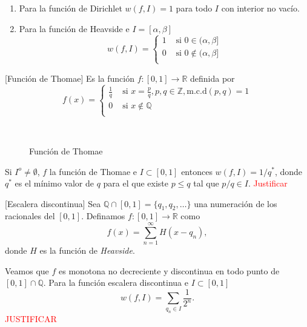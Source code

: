 \begin{ejemplo}{} 
\begin{enumerate}
 \item Para la función de Dirichlet $w(f,I)=1$ para todo $I$ con interior no vacío.
 \item Para la función de Heavside e $I=[\alpha,\beta]$
 \[
  w(f,I)=\begin{cases}
          1 & \text{ si } 0\in (\alpha,\beta]\\
          0 & \text{ si } 0\notin (\alpha,\beta]\\
         \end{cases}
 \]
\end{enumerate}
\end{ejemplo}






\begin{ejemplo}{}[Función de Thomae] Es la función $f:[0,1]\to\mathbb{R}$ definida por 
\[
 f(x)=\begin{cases} \frac{1}{q} & \text{ si } x=\frac{p}{q},p,q\in\mathbb{Z}, \text{m.c.d}(p,q)=1
 \\0 & \text{ si }   x\notin\mathbb{Q}\\
\end{cases}
\]

\begin{figure}[H]
\\
\caption{Función de Thomae}
\end{figure}


Si $I^o\neq\emptyset$, $f$ la función de Thomae e $I\subset [0,1]$ entonces 
     $ w(f,I)=1/q^*$, donde $q^*$ es el mínimo valor de $q$ para el que existe $p\leq q$ tal que $p/q\in I$. \textcolor{red}{Justificar}


\end{ejemplo}

 \begin{ejemplo}{}[Escalera discontinua] Sea $\mathbb{Q}\cap [0,1]=\{q_1,q_2,\ldots\}$ una numeración de los racionales del $[0,1]$. Definamos $f:[0,1]\to\mathbb{R}$ como
 \[
  f(x)=\sum_{n=1}^{\infty}H(x-q_n),
 \]
donde $H$ es la función de \emph{Heavside}. 

Veamos que $f$ es monotona no decreciente y discontinua en todo punto de $[0,1]\cap \mathbb{Q}$. 
 Para la función escalera discontinua e $I\subset [0,1]$
  \[
   w(f,I)=\sum_{q_n\in I}\frac{1}{2^n}.
  \]
  \textcolor{red}{JUSTIFICAR}


\end{ejemplo}










